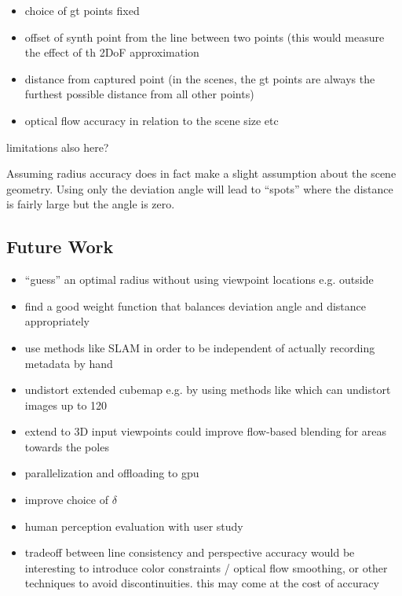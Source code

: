 \begin{itemize}
  \item choice of gt points \ar fixed
  \item \ar offset of synth point from the line between two points (this would measure the effect of th 2DoF approximation
  \item distance from captured point (in the scenes, the gt points are always the furthest possible distance from all other points)
  \item optical flow accuracy in relation to the scene size etc
\end{itemize}
limitations also here?

Assuming radius accuracy does in fact make a slight assumption about the scene geometry. Using only the deviation angle will lead to ``spots'' where the distance is fairly large but the angle is zero. 

\subsection{Future Work}
\begin{itemize}
  \item ``guess'' an optimal radius without using viewpoint locations e.g. outside
  \item find a good weight function that balances deviation angle and distance appropriately
  \item use methods like SLAM in order to be independent of actually recording metadata by hand
  \item undistort extended cubemap e.g. by using methods like \cite{fov} which can undistort images up to 120\degree
  \item extend to 3D \ar input viewpoints could improve flow-based blending for areas towards the poles
  \item parallelization and offloading to gpu
  \item improve choice of $\delta$
  \item human perception evaluation with user study
  \item tradeoff between line consistency and perspective accuracy \ar would be interesting to introduce color constraints / optical flow smoothing, or other techniques to avoid discontinuities. this may come at the cost of accuracy
\end{itemize}

